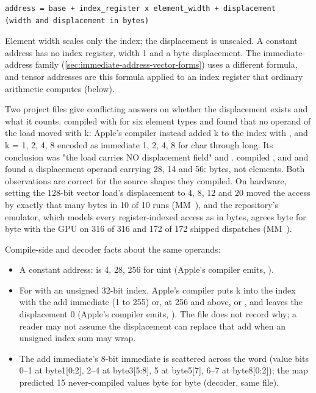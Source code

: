 \begin{lstlisting}
address = base + index_register x element_width + displacement        (width and displacement in bytes)
\end{lstlisting}

Element width scales only the index; the displacement is unscaled. A constant address has no index register, width 1 and a byte
displacement. The immediate-address family (\cref{sec:immediate-address-vector-forms}) uses a different formula, and tensor addresses are this
formula applied to an index register that ordinary arithmetic computes (below).

Two project files give conflicting answers on whether the displacement exists and what it counts.
 compiled  with  for six element types and found that no operand of the load moved with k: Apple's compiler instead added k to the index with , and k = 1, 2, 4, 8 encoded as immediate 1, 2, 4, 8 for char through long. Its conclusion was "the
load carries NO displacement field" and . 
compiled ,  and  and found a displacement operand carrying 28, 14 and 56: bytes, not
elements. Both observations are correct for the source shapes they compiled. On hardware, setting the 128-bit vector load's displacement to 4, 8, 12 and 20 moved the access by exactly that many bytes in 10 of
10 runs (MM~), and the repository's emulator, which models every register-indexed access as
 in bytes, agrees byte for byte with the GPU on 316 of 316 and 172 of 172 shipped
dispatches (MM~).

Compile-side and decoder facts about the same operands:

\begin{itemize}
\item A constant address:  is 4,  28,  256 for uint (Apple's compiler emits,
  ).
\item For  with an unsigned 32-bit index, Apple's compiler puts k into the index with the add immediate (1 to
  255) or, at 256 and above,  or , and leaves the
  displacement 0 (Apple's compiler emits, ). The file does not record why; a reader may
  not assume the displacement can replace that add when an unsigned index sum may wrap.
\item The add immediate's 8-bit immediate is scattered across the word (value bits 0–1 at byte1{[}0:2{]}, 2–4 at byte3{[}5:8{]}, 5 at
  byte5{[}7{]}, 6–7 at byte8{[}0:2{]}); the map predicted 15 never-compiled values byte for byte (decoder, same file).
\end{itemize}

